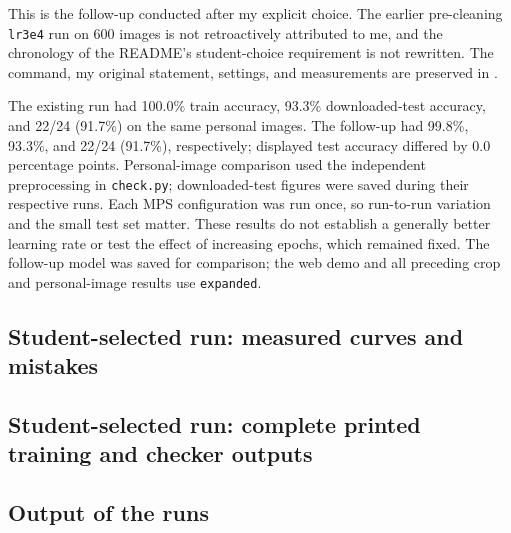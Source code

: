 \documentclass[11pt]{article}
\begin{document}
This is the follow-up conducted after my explicit choice. The earlier pre-cleaning \texttt{lr3e4} run on 600 images is not retroactively attributed to me, and the chronology of the README's student-choice requirement is not rewritten.
The command, my original statement, settings, and measurements are preserved in .

The existing run had 100.0\% train accuracy, 93.3\% downloaded-test accuracy, and 22/24 (91.7\%) on the same personal images. The follow-up had 99.8\%, 93.3\%, and 22/24 (91.7\%), respectively; displayed test accuracy differed by 0.0 percentage points. Personal-image comparison used the independent preprocessing in \texttt{check.py}; downloaded-test figures were saved during their respective runs.
Each MPS configuration was run once, so run-to-run variation and the small test set matter. These results do not establish a generally better learning rate or test the effect of increasing epochs, which remained fixed. The follow-up model was saved for comparison; the web demo and all preceding crop and personal-image results use \texttt{expanded}.

\clearpage
\subsection*{Student-selected run: measured curves and mistakes}
\par\noindent{}\par
\begin{center}\end{center}
\par\noindent{}\par
\clearpage
\subsection*{Student-selected run: complete printed training and checker outputs}

\subsection*{Output of the runs}
\end{document}

